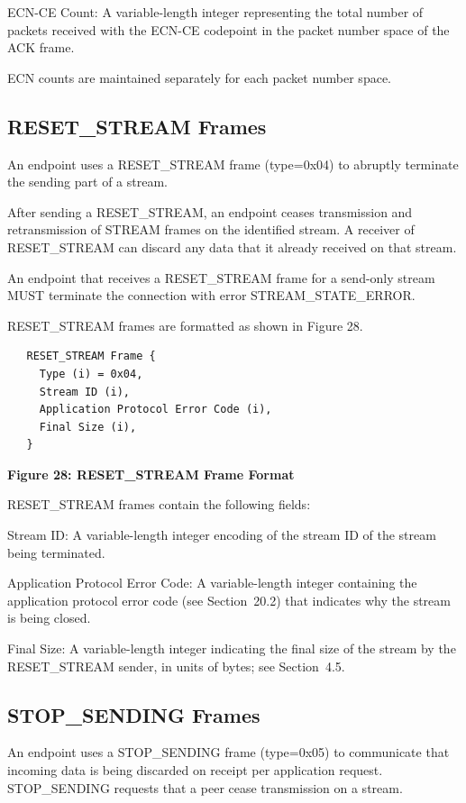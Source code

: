 \documentclass{article}
\begin{document}
ECN-CE Count:  A variable-length integer representing the total number of packets received with the ECN-CE codepoint in the packet number space of the ACK frame.

ECN counts are maintained separately for each packet number space.

\subsection{RESET\_STREAM Frames}

An endpoint uses a RESET\_STREAM frame (type=0x04) to abruptly terminate the sending part of a stream.

After sending a RESET\_STREAM, an endpoint ceases transmission and retransmission of STREAM frames on the identified stream.  A receiver of RESET\_STREAM can discard any data that it already received on that stream.

An endpoint that receives a RESET\_STREAM frame for a send-only stream MUST terminate the connection with error STREAM\_STATE\_ERROR.

RESET\_STREAM frames are formatted as shown in Figure 28.

\begin{verbatim}
   RESET_STREAM Frame {
     Type (i) = 0x04,
     Stream ID (i),
     Application Protocol Error Code (i),
     Final Size (i),
   }
\end{verbatim}

\begin{center}
\textbf{Figure 28: RESET\_STREAM Frame Format}
\end{center}

RESET\_STREAM frames contain the following fields:

Stream ID:  A variable-length integer encoding of the stream ID of the stream being terminated.

Application Protocol Error Code:  A variable-length integer containing the application protocol error code (see Section~20.2) that indicates why the stream is being closed.

Final Size:  A variable-length integer indicating the final size of the stream by the RESET\_STREAM sender, in units of bytes; see Section~4.5.

\subsection{STOP\_SENDING Frames}

An endpoint uses a STOP\_SENDING frame (type=0x05) to communicate that incoming data is being discarded on receipt per application request. STOP\_SENDING requests that a peer cease transmission on a stream.
\end{document}
